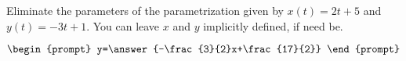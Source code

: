 \documentclass{ximera}
\author{Gregory Hartman \and Matthew Carr}
\begin{document}
\begin{exercise}




Eliminate the parameters of the parametrization given by $x(t)=2t+5$ and $y(t)=-3t+1$. You can leave $x$ and $y$ implicitly defined, if need be.

\[
\begin{prompt}
y=\answer{-\frac{3}{2}x+\frac{17}{2}}
\end{prompt}
\]

\end{exercise}
\end{document}
